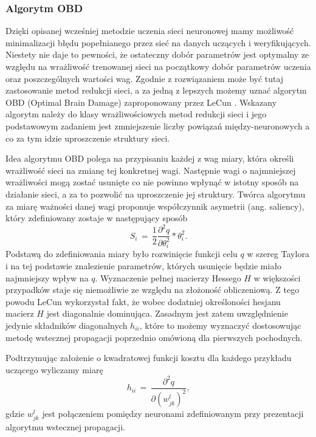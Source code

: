 \subsubsection{Algorytm OBD}
Dzięki opisanej wcześniej metodzie uczenia sieci neuronowej mamy możliwość minimalizacji błędu popełnianego przez sieć na danych uczących i weryfikujących. Niestety nie daje to pewności, że ostateczny dobór parametrów jest optymalny ze względu na wrażliwość trenowanej sieci na początkowy dobór parametrów uczenia oraz poszczególnych wartości wag. Zgodnie z \cite{osowski2013} rozwiązaniem może być tutaj zastosowanie metod redukcji sieci, a za jedną z lepszych możemy uznać algorytm OBD (Optimal Brain Damage) zaproponowany przez LeCun \cite{lecun1989}. Wskazany algorytm należy do klasy wrażliwościowych metod redukcji sieci i jego podstawowym zadaniem jest zmniejszenie liczby powiązań między-neuronowych a co za tym idzie uproszczenie struktury sieci. 
\par Idea algorytmu OBD polega na przypisaniu każdej z wag miary, która określi wrażliwość sieci na zmianę tej konkretnej wagi. Następnie wagi o najmniejszej wrażliwości mogą zostać usunięte co nie powinno wpłynąć w istotny sposób na działanie sieci, a za to pozwolić na uproszczenie jej struktury. Twórca algorytmu za miarę ważności danej wagi proponuje współczynnik asymetrii (ang. saliency), który zdefiniowany zostaje w następujący sposób
\begin{equation}
S_i \, = \, \frac{1}{2} \frac{\partial^2q}{\partial \theta_i^2} * \theta_i^2 .
\end{equation} 
Podstawą do zdefiniowania miary było rozwinięcie funkcji celu \(q\) w szereg Taylora i na tej podstawie znalezienie parametrów, których usunięcie będzie miało najmniejszy wpływ na  \(q\). Wyznaczenie pełnej macierzy Hessego \(H\) w większości przypadków staje się niemożliwie ze względu na złożoność obliczeniową. Z tego powodu LeCun wykorzystał fakt, że wobec dodatniej określoności hesjanu macierz \(H\) jest diagonalnie dominująca. Zasadnym jest zatem uwzględnienie jedynie składników diagonalnych \( h_{ii} \), które to możemy wyznaczyć dostosowując metodę wstecznej propagacji poprzednio omówioną dla pierwszych pochodnych. 
\par Podtrzymując założenie o kwadratowej funkcji kosztu dla każdego przykładu uczącego wyliczamy miarę
\begin{equation}
h_{ii} \, = \, \frac{\partial^2q}{\partial (w_{jk}^l)^2}, 
\end{equation}  
gdzie \( w_{jk}^l \) jest połączeniem pomiędzy neuronami zdefiniowanym przy prezentacji algorytmu wstecznej propagacji.
